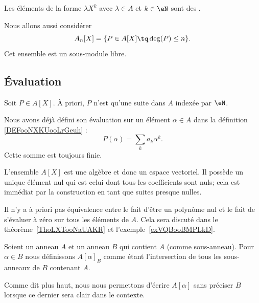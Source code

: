 \begin{normaltext}
	Les éléments de la forme \( \lambda X^k\) avec \( \lambda\in A\) et \( k\in\eN\) sont des .

	Nous allons aussi considérer
	\begin{equation}
		A_n[X]=\{ P\in A[X]\tq \deg(P)\leq n \}.
	\end{equation}
	Cet ensemble est un sous-module libre.
\end{normaltext}

\subsection{Évaluation}

Soit \( P\in A[X]\). À priori, \( P\) n'est qu'une suite dans \( A\) indexée par \( \eN\).


Nous avons déjà défini son évaluation sur un élément \( \alpha\in A\) dans la définition \ref{DEFooNXKUooLrGeuh} :
\begin{equation}
	P(\alpha)=\sum_ka_k\alpha^k.
\end{equation}
Cette somme est toujours finie.

\begin{normaltext}      \label{NORMooQFTJooLBcPxl}
	L'ensemble \( A[X]\) est une algèbre et donc un espace vectoriel. Il possède un unique élément nul qui est celui dont tous les coefficients sont nuls; cela est immédiat par la construction en tant que suites presque nulles.
\end{normaltext}

Il n'y a à priori pas équivalence entre le fait d'être un polynôme nul et le fait de s'évaluer à zéro sur tous les éléments de \( A\). Cela sera discuté dans le théorème~\ref{ThoLXTooNaUAKR} et l'exemple~\ref{exVQBooBMPLkD}.

\begin{definition}      \label{DEFooRFBFooKCXQsv}
	Soient un anneau \( A\) et un anneau \( B\) qui contient \( A\) (comme sous-anneau). Pour \( \alpha\in B\) nous définissons \( A[\alpha]_B\) comme étant l'intersection de tous les sous-anneaux de \( B\) contenant \( A\).
\end{definition}
Comme dit plus haut, nous nous permettons d'écrire \( A[\alpha]\) sans préciser \( B\) lorsque ce dernier sera clair dans le contexte.


